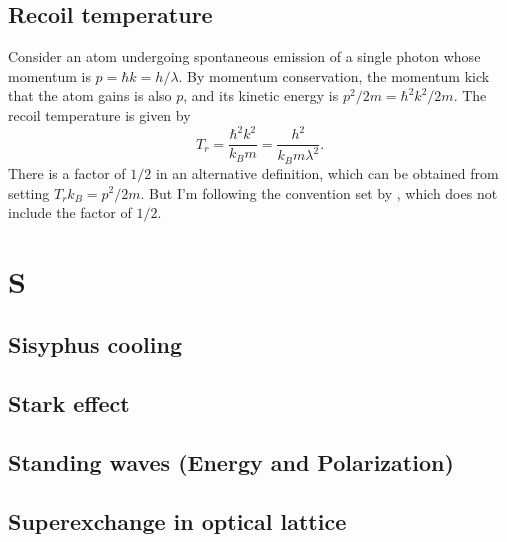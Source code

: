 \documentclass{book}
\theoremstyle{definition}
\newcommand{\f}[2]{\frac{#1}{#2}}
\begin{document}
\section*{Recoil temperature}

Consider an atom undergoing spontaneous emission of a single photon whose momentum is $p = \hbar k = h/\lambda$. By momentum conservation, the momentum kick that the atom gains is also $p$, and its kinetic energy is $p^2/2m = \hbar^2k^2/2m$. The recoil temperature is given by 
\begin{equation*}
T_r = \f{\hbar^2k^2}{k_Bm} = \f{h^2}{k_B m \lambda^2}.
\end{equation*} 
There is a factor of $1/2$ in an alternative definition, which can be obtained from setting $T_r k_B = p^2/2m$. But I'm following the convention set by \cite{metcalf2007laser}, which does not include the factor of $1/2$.



\chapter*{S}




\section*{Sisyphus cooling}


\section*{Stark effect}


\section*{Standing waves (Energy and Polarization)}






\section*{Superexchange in optical lattice}
\end{document}
